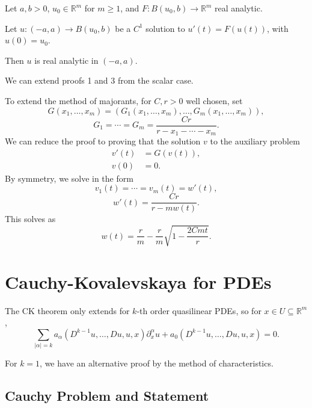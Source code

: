 \documentclass[12pt]{article}
\begin{document}

\begin{theorem}
	Let $a, b > 0$, $u_0 \in \mathbb{R}^m$ for $m \geq 1$, and $F : B(u_0, b) \to \mathbb{R}^m$ real analytic.

	Let $u : (-a, a) \to B(u_0, b)$ be a $C^1$ solution to $u'(t) = F(u(t))$, with $u(0) = u_0$.

	Then $u$ is real analytic in $(-a, a)$.
\end{theorem}

\begin{proofbox}
	We can extend proofs 1 and 3 from the scalar case.

	To extend the method of majorants, for $C, r > 0$ well chosen, set
	\[
	G(x_1, \ldots, x_m) = (G_1(x_1, \ldots, x_m), \ldots, G_m(x_1, \ldots, x_m)),
	\]
	\[
	G_1 = \cdots = G_m = \frac{Cr}{r - x_1 - \cdots - x_m}.
	\]
	We can reduce the proof to proving that the solution $v$ to the auxiliary problem
	\begin{align*}
		v'(t) &= G(v(t)),\\
		v(0) &= 0.
	\end{align*}
	By symmetry, we solve in the form
	\[
	v_1(t) = \cdots = v_m(t) = w'(t),
	\]
	\[
	w'(t) = \frac{Cr}{r - m w(t)}.
	\]
	This solves as
	\[
		w(t) = \frac{r}{m} - \frac{r}{m} \sqrt{1 - \frac{2 C m t}{r}}.
	\]
\end{proofbox}

\newpage

\section{Cauchy-Kovalevskaya for PDEs}%
\label{sec:ck_pde}

The CK theorem only extends for $k$-th order quasilinear PDEs, so for $x \in U \subseteq \mathbb{R}^m$,
\[
\sum_{|\alpha| = k} a_\alpha (D^{k-1} u, \ldots, Du, u, x) \partial^\alpha_x u + a_0 (D^{k-1} u, \ldots, Du, u, x) = 0.
\]
\begin{remark}
	For $k = 1$, we have an alternative proof by the method of characteristics.
\end{remark}

\subsection{Cauchy Problem and Statement}%
\label{sub:cp_s}
\end{document}

